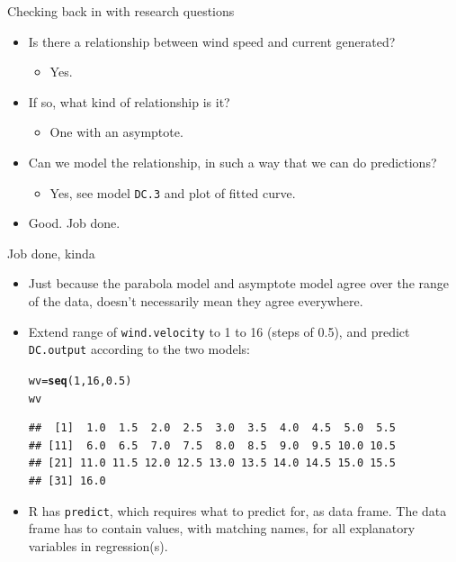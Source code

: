 \documentclass[unknownkeysallowed]{beamer}\usepackage[]{graphicx}\usepackage[]{color}
\makeatletter
\newcommand{\hlnum}[1]{\textcolor[rgb]{0.686,0.059,0.569}{#1}}%
\newcommand{\hlstd}[1]{\textcolor[rgb]{0.345,0.345,0.345}{#1}}%
\newcommand{\hlkwb}[1]{\textcolor[rgb]{0.69,0.353,0.396}{#1}}%
\newcommand{\hlkwd}[1]{\textcolor[rgb]{0.737,0.353,0.396}{\textbf{#1}}}%
\newenvironment{kframe}{%
 \def\at@end@of@kframe{}%
 \ifinner\ifhmode%
  \def\at@end@of@kframe{\end{minipage}}%
  \begin{minipage}{\columnwidth}%
 \fi\fi%
 \def\FrameCommand##1{\hskip\@totalleftmargin \hskip-\fboxsep
 \colorbox{shadecolor}{##1}\hskip-\fboxsep
     \hskip-\linewidth \hskip-\@totalleftmargin \hskip\columnwidth}%
 \MakeFramed {\advance\hsize-\width
   \@totalleftmargin\z@ \linewidth\hsize
   \@setminipage}}%
 {\par\unskip\endMakeFramed%
 \at@end@of@kframe}
\newenvironment{knitrout}{}{} %
\makeatother
\begin{document}
\begin{frame}[fragile]{Checking back in with research questions}

  \begin{itemize}
  \item Is there a relationship between wind speed and current
    generated?
    \begin{itemize}
    \item Yes.
    \end{itemize}
  \item If so, what kind of relationship is it?
    \begin{itemize}
    \item One with an asymptote.
    \end{itemize}
  \item Can we model the relationship, in such a way that we can do
    predictions?
    \begin{itemize}
    \item Yes, see model \texttt{DC.3} and plot of fitted curve.
    \end{itemize}
  \item Good. Job done.
  \end{itemize}


\end{frame}

\begin{frame}[fragile]{Job done, kinda}

  \begin{itemize}
  \item Just because the parabola model and asymptote model agree over the
range of the data, doesn't necessarily mean they agree everywhere.
\item Extend range of \texttt{wind.velocity} to 1 to 16 (steps of
  0.5), and predict \texttt{DC.output} according to the two models:



\begin{knitrout}
\color{fgcolor}\begin{kframe}
\begin{alltt}
\hlstd{wv}\hlkwb{=}\hlkwd{seq}\hlstd{(}\hlnum{1}\hlstd{,}\hlnum{16}\hlstd{,}\hlnum{0.5}\hlstd{)}
\hlstd{wv}
\end{alltt}
\begin{verbatim}
##  [1]  1.0  1.5  2.0  2.5  3.0  3.5  4.0  4.5  5.0  5.5
## [11]  6.0  6.5  7.0  7.5  8.0  8.5  9.0  9.5 10.0 10.5
## [21] 11.0 11.5 12.0 12.5 13.0 13.5 14.0 14.5 15.0 15.5
## [31] 16.0
\end{verbatim}
\end{kframe}
\end{knitrout}

\item R has \texttt{predict}, which requires what to predict for, as
  data frame. The data frame has to contain values, with matching
  names, for all explanatory variables in regression(s).

  \end{itemize}

  
\end{frame}
\end{document}
